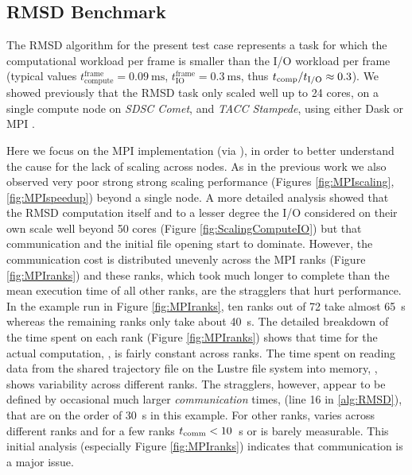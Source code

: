 \label{impl_exp}

\subsection{RMSD Benchmark}
\label{sec:RMSD}
The RMSD algorithm for the present test case represents a task for which the computational workload per frame is smaller than the I/O workload per frame (typical values $t_{\text{compute}}^{\text{frame}} = 0.09\ \text{ms}$, $t_{\text{IO}}^{\text{frame}} = 0.3\ \text{ms}$, thus ${t}_{\text{comp}}/{t}_{\text{I/O}} \approx 0.3$). 
We showed previously that the RMSD task only scaled well up to 24 cores, on a single compute node on \emph{SDSC Comet}, and \emph{TACC Stampede}, using either Dask or MPI \cite{Khoshlessan:2017ab}.

Here we focus on the MPI implementation (via  \cite{Dalcin:2011aa, Dalcin:2005aa}), in order to better understand the cause for the lack of scaling across nodes.
As in the previous work we also observed very poor strong strong scaling performance (Figures \ref{fig:MPIscaling}, \ref{fig:MPIspeedup}) beyond a single node.
A more detailed analysis showed that the RMSD computation itself and to a lesser degree the I/O considered on their own scale well beyond 50 cores (Figure \ref{fig:ScalingComputeIO}) but that communication and the initial file opening start to dominate.
However, the communication cost is distributed unevenly across the MPI ranks (Figure \ref{fig:MPIranks}) and these ranks, which took much longer to complete than the mean execution time of all other ranks, are the stragglers that hurt performance. 
In the example run in Figure \ref{fig:MPIranks}, ten ranks out of 72 take almost 65~s whereas the
remaining ranks only take about 40~s. The detailed breakdown of the time spent on each rank (Figure \ref{fig:MPIranks}) shows that time
for the actual computation, \tcomp, is fairly constant across ranks. 
The time spent on reading data from the shared trajectory file on the Lustre file system into memory, \tIO, shows variability across different ranks. 
The stragglers, however, appear to be defined by occasional much larger \emph{communication} times, \tcomm (line 16 in \ref{alg:RMSD}), that are on the order of 30~s in this example. 
For other ranks, \tcomm varies across different ranks and for a few ranks $t_{\text{comm}} < 10$~s or is barely measurable. 
This initial analysis (especially Figure \ref{fig:MPIranks}) indicates that communication is a major issue. 

